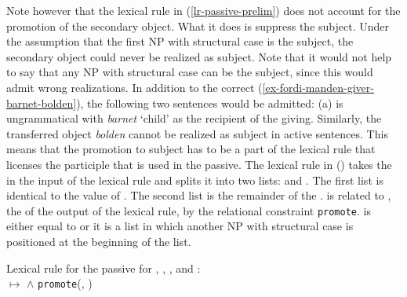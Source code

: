 Note however that the lexical rule in (\ref{lr-passive-prelim}) does not account for the promotion
of the secondary object. What it does is suppress the subject. Under the assumption that the
first NP with structural case is the subject, the secondary object could never be realized as
subject. Note that it would not help to say that any NP with structural case can be the subject, since
this would admit wrong realizations. In addition to the correct
(\ref{ex-fordi-manden-giver-barnet-bolden}), the following two sentences would be admitted: 
\eal
{}
\zl
(a) is ungrammatical with \emph{barnet} `child' as the recipient of the giving. Similarly, the
transferred object \emph{bolden} cannot be realized as subject in active sentences. This means that
the promotion to subject has to be a part of the lexical  rule that licenses the participle that is
used in the passive. The lexical rule in () takes the \argstl in the input of the lexical rule and splits it into two
lists:  and . The first list  is identical to the value of \da. The second list  is the
remainder of the \argstl.  is related to , the \argstv of the output of the lexical rule, by the relational constraint
\texttt{promote}.  is either equal to  or it is a list in which another NP with
structural case is positioned at the beginning of the list.

\eas
\label{lr-passive-double-object}
Lexical rule for the passive for , , , and :\\
 $\mapsto$
 $\wedge$ \texttt{promote}(, )
\zs

